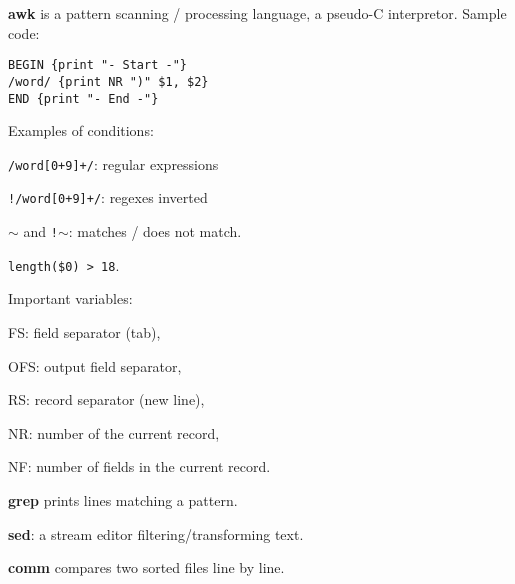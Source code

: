 \renewcommand\theFancyVerbLine{\normalsize\arabic{FancyVerbLine}}

\begin{enumx}
    \item [\cmd] \textbf{awk} is a pattern scanning / processing language,
    a pseudo-C interpretor.
    Sample code:
\begin{verbatim}
BEGIN {print "- Start -"}
/word/ {print NR ")" $1, $2}
END {print "- End -"}
\end{verbatim}

\item [] Examples of conditions:
\begin{enumx}
    \item \texttt{/word[0+9]+/}: regular expressions
    \item \texttt{!/word[0+9]+/}: regexes inverted
    \item \texttt{$\sim$} and \texttt{!$\sim$}: matches / does not match.
    \item \texttt{length(\$0) > 18}.
\end{enumx} 

\item [] Important variables:
\begin{enumx}
    \item FS: field separator (tab),
    \item OFS: output field separator,
    \item RS: record separator (new line),
    \item NR: number of the current record,
    \item NF: number of fields in the current record.
\end{enumx} 

\item [\cmd] \textbf{grep} prints lines matching a pattern.
\item [\cmd] \textbf{sed}: a stream editor filtering/transforming text.
\end{enumx}

\begin{enumx}
	\item [\cmd] \textbf{comm} compares two sorted files line by line.
\end{enumx}

